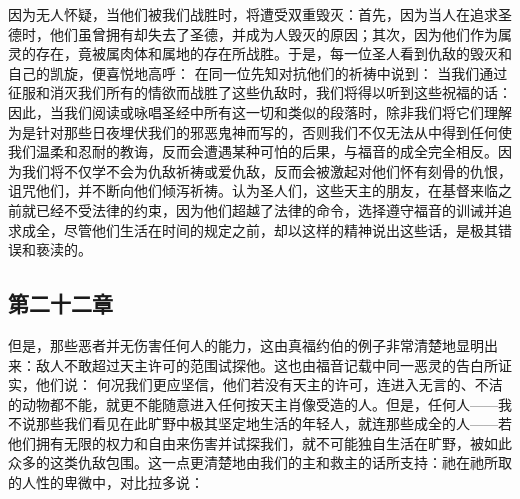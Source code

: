 因为无人怀疑，当他们被我们战胜时，将遭受双重毁灭：首先，因为当人在追求圣德时，他们虽曾拥有却失去了圣德，并成为人毁灭的原因；其次，因为他们作为属灵的存在，竟被属肉体和属地的存在所战胜。于是，每一位圣人看到仇敌的毁灭和自己的凯旋，便喜悦地高呼： 在同一位先知对抗他们的祈祷中说到： 当我们通过征服和消灭我们所有的情欲而战胜了这些仇敌时，我们将得以听到这些祝福的话：  因此，当我们阅读或咏唱圣经中所有这一切和类似的段落时，除非我们将它们理解为是针对那些日夜埋伏我们的邪恶鬼神而写的，否则我们不仅无法从中得到任何使我们温柔和忍耐的教诲，反而会遭遇某种可怕的后果，与福音的成全完全相反。因为我们将不仅学不会为仇敌祈祷或爱仇敌，反而会被激起对他们怀有刻骨的仇恨，诅咒他们，并不断向他们倾泻祈祷。认为圣人们，这些天主的朋友，在基督来临之前就已经不受法律的约束，因为他们超越了法律的命令，选择遵守福音的训诫并追求成全，尽管他们生活在时间的规定之前，却以这样的精神说出这些话，是极其错误和亵渎的。\par


\subsection{第二十二章}

\par

但是，那些恶者并无伤害任何人的能力，这由真福约伯的例子非常清楚地显明出来：敌人不敢超过天主许可的范围试探他。这也由福音记载中同一恶灵的告白所证实，他们说： 何况我们更应坚信，他们若没有天主的许可，连进入无言的、不洁的动物都不能，就更不能随意进入任何按天主肖像受造的人。但是，任何人——我不说那些我们看见在此旷野中极其坚定地生活的年轻人，就连那些成全的人——若他们拥有无限的权力和自由来伤害并试探我们，就不可能独自生活在旷野，被如此众多的这类仇敌包围。这一点更清楚地由我们的主和救主的话所支持：祂在祂所取的人性的卑微中，对比拉多说：\par


